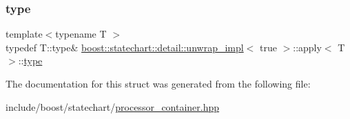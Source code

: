 \subsubsection{\texorpdfstring{type}{type}}
{\footnotesize\ttfamily template$<$typename T $>$ \\
typedef T\+::type\& \mbox{\hyperlink{structboost_1_1statechart_1_1detail_1_1unwrap__impl}{boost\+::statechart\+::detail\+::unwrap\+\_\+impl}}$<$ true $>$\+::apply$<$ T $>$\+::\mbox{\hyperlink{structboost_1_1statechart_1_1detail_1_1unwrap__impl_3_01true_01_4_1_1apply_a780f1b70daae566b269900bd6aa0126c}{type}}}



The documentation for this struct was generated from the following file\+:\begin{DoxyCompactItemize}
\item 
include/boost/statechart/\mbox{\hyperlink{processor__container_8hpp}{processor\+\_\+container.\+hpp}}\end{DoxyCompactItemize}
